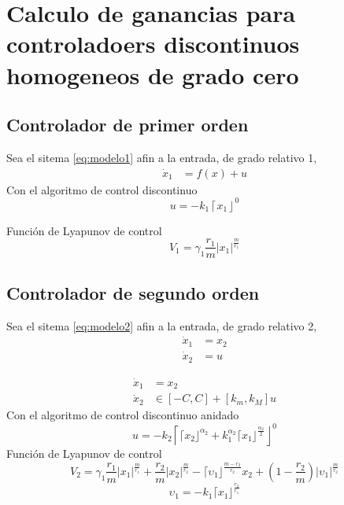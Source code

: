 \chapter{Calculo de ganancias para controladoers discontinuos homogeneos de grado cero} \label{Cap3}
\section{Controlador de primer orden}
Sea el sitema \ref{eq:modelo1} afin a la entrada, de grado relativo 1, 
\begin{subequations}\label{eq:modelo1}
  \begin{align}\label{eq:modelo1a}
    \dot{x}_1&=f(x) +u 
  \end{align}
\end{subequations}
Con el algoritmo de control discontinuo
  \begin{equation}
      u=-k_1 \left\lceil x_1  \right\rfloor^0
    \end{equation} 

    Función de Lyapunov de control
    \begin{equation}
          V_1=\gamma_1 \frac{r_1}{m} |x_1|^{\frac{m}{r_1}}
    \end{equation}
\section{Controlador de segundo orden}
Sea el sitema \ref{eq:modelo2} afin a la entrada, de grado relativo 2, 
\begin{subequations}\label{eq:modelo2}
  \begin{align}\label{eq:modelo1a}
    \dot{x}_1&=x_2 \\
    \dot{x}_2&=u
  \end{align}
\end{subequations}


  \begin{equation}
      \begin{split}
      \dot{x}_1&=x_2\\
      \dot{x}_2& \in [-C,C]+ [k_m, k_M] u
      \end{split}
      \label{inclusion2}
  \end{equation}
  Con el algoritmo de control discontinuo anidado
  \begin{equation}
      u=-k_2 \left\lceil \lceil x_2 \rfloor^{\alpha_2}+k_1^{\alpha_2} \lceil x_1 \rfloor^{\frac{\alpha_2}{2}} \right\rfloor^0
    \end{equation} 
    Función de Lyapunov de control
  \begin{equation}
        V_2=\gamma_1 \frac{r_1}{m} |x_1|^{\frac{m}{r_1}}+\frac{r_2}{m} |x_2|^{\frac{m}{r_2}}-\lceil \upsilon_1 \rfloor^{\frac{m-r_2}{r_2}} x_2 + \left(1-\frac{r_2}{m}\right)|\upsilon_1|^{\frac{m}{r_2}}
  \end{equation}
  \begin{equation}
        \upsilon_1=-k_1 \lceil x_1 \rfloor^{\frac{r_2}{r_1}}
   \end{equation}


